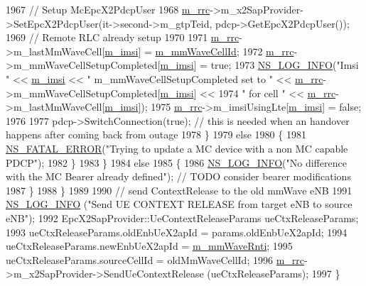\begin{DoxyCode}
1967         \textcolor{comment}{// Setup McEpcX2PdcpUser}
1968         \hyperlink{classns3_1_1UeManager_ab4405e9f354c66e7c1a4c95832290f5b}{m\_rrc}->m\_x2SapProvider->SetEpcX2PdcpUser(it->second->m\_gtpTeid, pdcp->GetEpcX2PdcpUser());
1969         \textcolor{comment}{// Remote RLC already setup}
1970 
1971         \hyperlink{classns3_1_1UeManager_ab4405e9f354c66e7c1a4c95832290f5b}{m\_rrc}->m\_lastMmWaveCell[\hyperlink{classns3_1_1UeManager_a868dda076ecfc1d4202e357c16223d84}{m\_imsi}] = \hyperlink{classns3_1_1UeManager_a0f53cb816bd8a3ad6227dc9adca671b2}{m\_mmWaveCellId};
1972         \hyperlink{classns3_1_1UeManager_ab4405e9f354c66e7c1a4c95832290f5b}{m\_rrc}->m\_mmWaveCellSetupCompleted[\hyperlink{classns3_1_1UeManager_a868dda076ecfc1d4202e357c16223d84}{m\_imsi}] = \textcolor{keyword}{true};
1973         \hyperlink{group__logging_gafbd73ee2cf9f26b319f49086d8e860fb}{NS\_LOG\_INFO}(\textcolor{stringliteral}{"Imsi "} << \hyperlink{classns3_1_1UeManager_a868dda076ecfc1d4202e357c16223d84}{m\_imsi} << \textcolor{stringliteral}{" m\_mmWaveCellSetupCompleted set to "} << 
      \hyperlink{classns3_1_1UeManager_ab4405e9f354c66e7c1a4c95832290f5b}{m\_rrc}->m\_mmWaveCellSetupCompleted[\hyperlink{classns3_1_1UeManager_a868dda076ecfc1d4202e357c16223d84}{m\_imsi}] << 
1974                 \textcolor{stringliteral}{" for cell "} <<  \hyperlink{classns3_1_1UeManager_ab4405e9f354c66e7c1a4c95832290f5b}{m\_rrc}->m\_lastMmWaveCell[\hyperlink{classns3_1_1UeManager_a868dda076ecfc1d4202e357c16223d84}{m\_imsi}]);
1975         \hyperlink{classns3_1_1UeManager_ab4405e9f354c66e7c1a4c95832290f5b}{m\_rrc}->m\_imsiUsingLte[\hyperlink{classns3_1_1UeManager_a868dda076ecfc1d4202e357c16223d84}{m\_imsi}] = \textcolor{keyword}{false};
1976 
1977         pdcp->SwitchConnection(\textcolor{keyword}{true}); \textcolor{comment}{// this is needed when an handover happens after coming back from
       outage}
1978       \}
1979       \textcolor{keywordflow}{else}
1980       \{
1981         \hyperlink{group__fatal_ga5131d5e3f75d7d4cbfd706ac456fdc85}{NS\_FATAL\_ERROR}(\textcolor{stringliteral}{"Trying to update a MC device with a non MC capable PDCP"});
1982       \}  
1983     \}
1984     \textcolor{keywordflow}{else}
1985     \{
1986       \hyperlink{group__logging_gafbd73ee2cf9f26b319f49086d8e860fb}{NS\_LOG\_INFO}(\textcolor{stringliteral}{"No difference with the MC Bearer already defined"}); \textcolor{comment}{// TODO consider bearer
       modifications}
1987     \}  
1988   \}
1989 
1990   \textcolor{comment}{// send ContextRelease to the old mmWave eNB}
1991   \hyperlink{group__logging_gafbd73ee2cf9f26b319f49086d8e860fb}{NS\_LOG\_INFO} (\textcolor{stringliteral}{"Send UE CONTEXT RELEASE from target eNB to source eNB"});
1992   EpcX2SapProvider::UeContextReleaseParams ueCtxReleaseParams;
1993   ueCtxReleaseParams.oldEnbUeX2apId = params.oldEnbUeX2apId;
1994   ueCtxReleaseParams.newEnbUeX2apId = \hyperlink{classns3_1_1UeManager_a3d5cf7dc8a13b9e2616ecb9a70faebd3}{m\_mmWaveRnti};
1995   ueCtxReleaseParams.sourceCellId = oldMmWaveCellId;
1996   \hyperlink{classns3_1_1UeManager_ab4405e9f354c66e7c1a4c95832290f5b}{m\_rrc}->m\_x2SapProvider->SendUeContextRelease (ueCtxReleaseParams); 
1997 \}
\end{DoxyCode}
